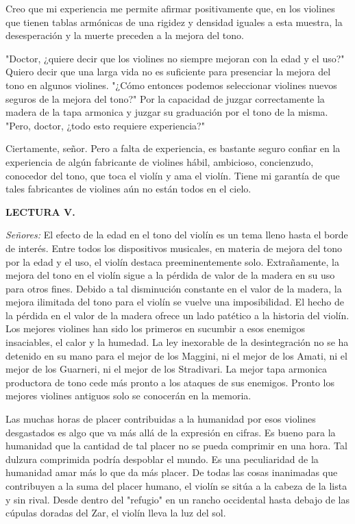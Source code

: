 \documentclass[12pt]{book}
\begin{document}
Creo que mi experiencia me permite afirmar positivamente que, en los violines que tienen tablas armónicas de una rigidez y densidad iguales a esta muestra, la desesperación y la muerte preceden a la mejora del tono.

"Doctor, ¿quiere decir que los violines no siempre mejoran con la edad y el uso?"
Quiero decir que una larga vida no es suficiente para presenciar la mejora del tono en algunos violines.
"¿Cómo entonces podemos seleccionar violines nuevos seguros de la mejora del tono?"
Por la capacidad de juzgar correctamente la madera de la tapa armonica y juzgar su graduación por el tono de la misma.
"Pero, doctor, ¿todo esto requiere experiencia?"

Ciertamente, señor. Pero a falta de experiencia, es bastante seguro confiar en la experiencia de algún fabricante de violines hábil, ambicioso, concienzudo, conocedor del tono, que toca el violín y ama el violín. Tiene mi garantía de que tales fabricantes de violines aún no están todos en el cielo.

\textbf{LECTURA V.}

\textit{Señores:} El efecto de la edad en el tono del violín es un tema lleno hasta el borde de interés. Entre todos los dispositivos musicales, en materia de mejora del tono por la edad y el uso, el violín destaca preeminentemente solo. Extrañamente, la mejora del tono en el violín sigue a la pérdida de valor de la madera en su uso para otros fines. Debido a tal disminución constante en el valor de la madera, la mejora ilimitada del tono para el violín se vuelve una imposibilidad. El hecho de la pérdida en el valor de la madera ofrece un lado patético a la historia del violín. Los mejores violines han sido los primeros en sucumbir a esos enemigos insaciables, el calor y la humedad. La ley inexorable de la desintegración no se ha detenido en su mano para el mejor de los Maggini, ni el mejor de los Amati, ni el mejor de los Guarneri, ni el mejor de los Stradivari. La mejor tapa armonica productora de tono cede más pronto a los ataques de sus enemigos. Pronto los mejores violines antiguos solo se conocerán en la memoria.

Las muchas horas de placer contribuidas a la humanidad por esos violines desgastados es algo que va más allá de la expresión en cifras. Es bueno para la humanidad que la cantidad de tal placer no se pueda comprimir en una hora. Tal dulzura comprimida podría despoblar el mundo. Es una peculiaridad de la humanidad amar más lo que da más placer. De todas las cosas inanimadas que contribuyen a la suma del placer humano, el violín se sitúa a la cabeza de la lista y sin rival. Desde dentro del "refugio" en un rancho occidental hasta debajo de las cúpulas doradas del Zar, el violín lleva la luz del sol.
\end{document}
